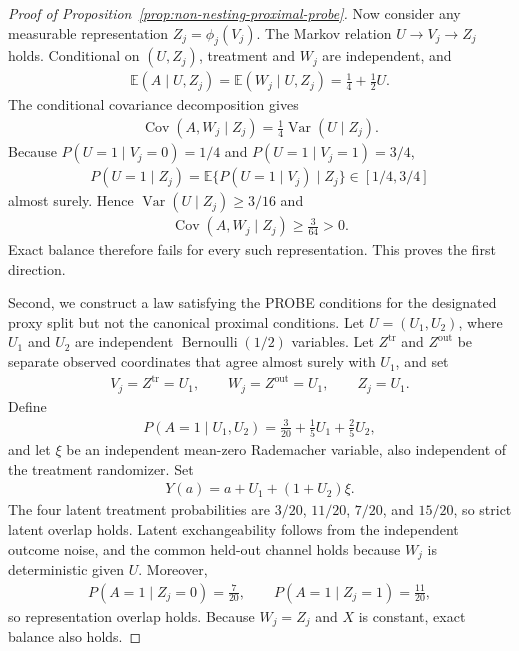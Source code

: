 \begin{proof}[Proof of Proposition~\ref{prop:non-nesting-proximal-probe}]
Now consider any measurable representation $Z_j=\phi_j(V_j)$. The Markov relation $U\to V_j\to Z_j$ holds. Conditional on $(U,Z_j)$, treatment and $W_j$ are independent, and
\begin{align*}
\mathbb E(A\mid U,Z_j)
=
\mathbb E(W_j\mid U,Z_j)
=
\frac14+\frac12U.
\end{align*}
The conditional covariance decomposition gives
\begin{align*}
\operatorname{Cov}(A,W_j\mid Z_j)
=
\frac14\operatorname{Var}(U\mid Z_j).
\end{align*}
Because $P(U=1\mid V_j=0)=1/4$ and $P(U=1\mid V_j=1)=3/4$,
\begin{align*}
P(U=1\mid Z_j)
=
\mathbb E\{P(U=1\mid V_j)\mid Z_j\}
\in[1/4,3/4]
\end{align*}
almost surely. Hence $\operatorname{Var}(U\mid Z_j)\ge3/16$ and
\begin{align*}
\operatorname{Cov}(A,W_j\mid Z_j)\ge\frac{3}{64}>0.
\end{align*}
Exact balance therefore fails for every such representation. This proves the first direction.

Second, we construct a law satisfying the PROBE conditions for the designated proxy split but not the canonical proximal conditions. Let $U=(U_1,U_2)$, where $U_1$ and $U_2$ are independent $\operatorname{Bernoulli}(1/2)$ variables. Let $Z^{\mathrm{tr}}$ and $Z^{\mathrm{out}}$ be separate observed coordinates that agree almost surely with $U_1$, and set
\begin{align*}
V_j=Z^{\mathrm{tr}}=U_1,
\qquad
W_j=Z^{\mathrm{out}}=U_1,
\qquad
Z_j=U_1.
\end{align*}
Define
\begin{align*}
P(A=1\mid U_1,U_2)
=
\frac3{20}+\frac15U_1+\frac25U_2,
\end{align*}
and let $\xi$ be an independent mean-zero Rademacher variable, also independent of the treatment randomizer. Set
\begin{align*}
Y(a)=a+U_1+(1+U_2)\xi.
\end{align*}
The four latent treatment probabilities are $3/20$, $11/20$, $7/20$, and $15/20$, so strict latent overlap holds. Latent exchangeability follows from the independent outcome noise, and the common held-out channel holds because $W_j$ is deterministic given $U$. Moreover,
\begin{align*}
P(A=1\mid Z_j=0)=\frac7{20},
\qquad
P(A=1\mid Z_j=1)=\frac{11}{20},
\end{align*}
so representation overlap holds. Because $W_j=Z_j$ and $X$ is constant, exact balance also holds.


\end{proof}
